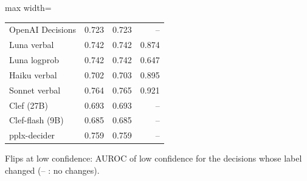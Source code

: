 \begin{table}[t]
\begin{adjustbox}{max width=\linewidth}
\begin{tabular}{lrrr}
OpenAI Decisions & 0.723 & 0.723 & -- \\
Luna verbal & 0.742 & 0.742 & 0.874 \\
Luna logprob & 0.742 & 0.742 & 0.647 \\
Haiku verbal & 0.702 & 0.703 & 0.895 \\
Sonnet verbal & 0.764 & 0.765 & 0.921 \\
Clef (27B) & 0.693 & 0.693 & -- \\
Clef-flash (9B) & 0.685 & 0.685 & -- \\
pplx-decider & 0.759 & 0.759 & -- \\
\bottomrule
\end{tabular}
\end{adjustbox}
\par\smallskip\footnotesize\raggedright Flips at low confidence: AUROC of low confidence for the decisions whose label changed (-- : no changes).
\end{table}
